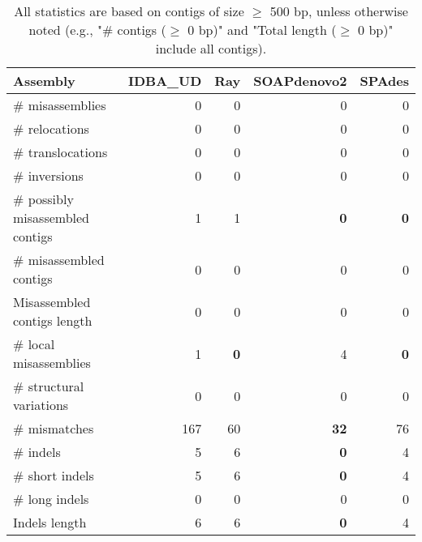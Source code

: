 \documentclass[12pt,a4paper]{article}
\begin{document}
\begin{table}[ht]
\begin{center}
\caption{All statistics are based on contigs of size $\geq$ 500 bp, unless otherwise noted (e.g., "\# contigs ($\geq$ 0 bp)" and "Total length ($\geq$ 0 bp)" include all contigs).}
\begin{tabular}{|l*{4}{|r}|}
\hline
Assembly & IDBA\_UD & Ray & SOAPdenovo2 & SPAdes \\ \hline
\# misassemblies & 0 & 0 & 0 & 0 \\ \hline
\hspace{5mm}\# relocations & 0 & 0 & 0 & 0 \\ \hline
\hspace{5mm}\# translocations & 0 & 0 & 0 & 0 \\ \hline
\hspace{5mm}\# inversions & 0 & 0 & 0 & 0 \\ \hline
\# possibly misassembled contigs & 1 & 1 & {\bf 0} & {\bf 0} \\ \hline
\# misassembled contigs & 0 & 0 & 0 & 0 \\ \hline
Misassembled contigs length & 0 & 0 & 0 & 0 \\ \hline
\# local misassemblies & 1 & {\bf 0} & 4 & {\bf 0} \\ \hline
\# structural variations & 0 & 0 & 0 & 0 \\ \hline
\# mismatches & 167 & 60 & {\bf 32} & 76 \\ \hline
\# indels & 5 & 6 & {\bf 0} & 4 \\ \hline
\hspace{5mm}\# short indels & 5 & 6 & {\bf 0} & 4 \\ \hline
\hspace{5mm}\# long indels & 0 & 0 & 0 & 0 \\ \hline
Indels length & 6 & 6 & {\bf 0} & 4 \\ \hline
\end{tabular}
\end{center}
\end{table}
\end{document}
